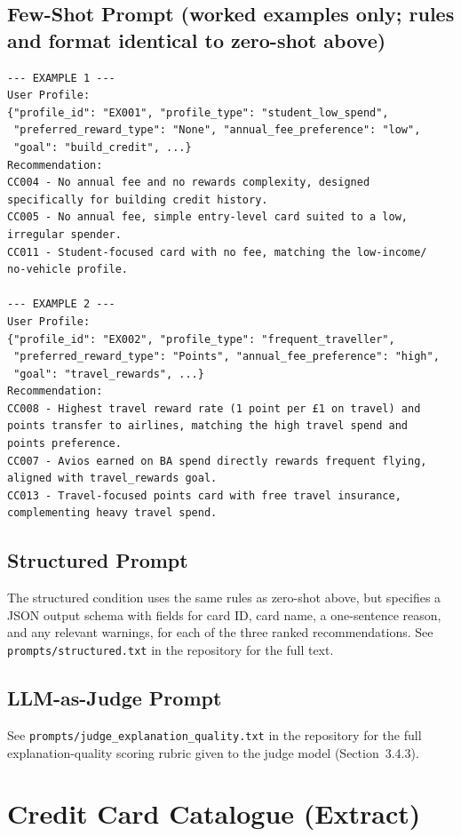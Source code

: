 \section{Few-Shot Prompt (worked examples only; rules and format identical to zero-shot above)}
\begin{verbatim}
--- EXAMPLE 1 ---
User Profile:
{"profile_id": "EX001", "profile_type": "student_low_spend",
 "preferred_reward_type": "None", "annual_fee_preference": "low",
 "goal": "build_credit", ...}
Recommendation:
CC004 - No annual fee and no rewards complexity, designed
specifically for building credit history.
CC005 - No annual fee, simple entry-level card suited to a low,
irregular spender.
CC011 - Student-focused card with no fee, matching the low-income/
no-vehicle profile.

--- EXAMPLE 2 ---
User Profile:
{"profile_id": "EX002", "profile_type": "frequent_traveller",
 "preferred_reward_type": "Points", "annual_fee_preference": "high",
 "goal": "travel_rewards", ...}
Recommendation:
CC008 - Highest travel reward rate (1 point per £1 on travel) and
points transfer to airlines, matching the high travel spend and
points preference.
CC007 - Avios earned on BA spend directly rewards frequent flying,
aligned with travel_rewards goal.
CC013 - Travel-focused points card with free travel insurance,
complementing heavy travel spend.
\end{verbatim}

\section{Structured Prompt}
The structured condition uses the same rules as zero-shot above, but specifies a JSON output schema with fields for card ID, card name, a one-sentence reason, and any relevant warnings, for each of the three ranked recommendations. See \texttt{prompts/structured.txt} in the repository for the full text.

\section{LLM-as-Judge Prompt}
See \texttt{prompts/judge\_explanation\_quality.txt} in the repository for the full explanation-quality scoring rubric given to the judge model (Section~3.4.3).

\chapter{Credit Card Catalogue (Extract)}


